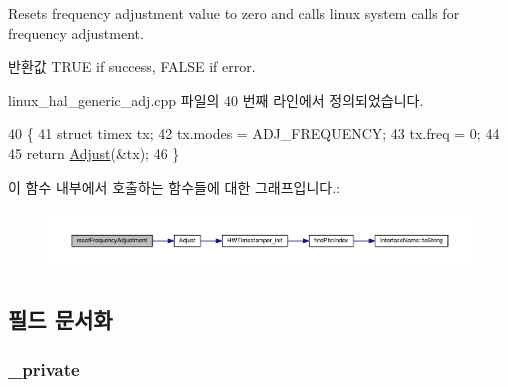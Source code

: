 Resets frequency adjustment value to zero and calls linux system calls for frequency adjustment. 

\begin{DoxyReturn}{반환값}
T\+R\+UE if success, F\+A\+L\+SE if error. 
\end{DoxyReturn}


linux\+\_\+hal\+\_\+generic\+\_\+adj.\+cpp 파일의 40 번째 라인에서 정의되었습니다.


\begin{DoxyCode}
40                                                        \{
41     \textcolor{keyword}{struct }timex tx;
42     tx.modes = ADJ\_FREQUENCY;
43     tx.freq = 0;
44 
45     \textcolor{keywordflow}{return} \hyperlink{class_linux_timestamper_generic_a1d52a5a84b74222b880522cee01475e1}{Adjust}(&tx);
46 \}
\end{DoxyCode}


이 함수 내부에서 호출하는 함수들에 대한 그래프입니다.\+:
\nopagebreak
\begin{figure}[H]
\begin{center}
\leavevmode
\includegraphics[width=350pt]{class_linux_timestamper_generic_a0db03755529ffca07f6d4a46d26a60c8_cgraph}
\end{center}
\end{figure}




\subsection{필드 문서화}
\subsubsection[{\texorpdfstring{\+\_\+private}{_private}}]{ \+\_\+private\hspace{0.3cm}{\ttfamily [private]}}\hypertarget{class_linux_timestamper_generic_a5522acc6ce53752665fa393702058a7b}{}\label{class_linux_timestamper_generic_a5522acc6ce53752665fa393702058a7b}


